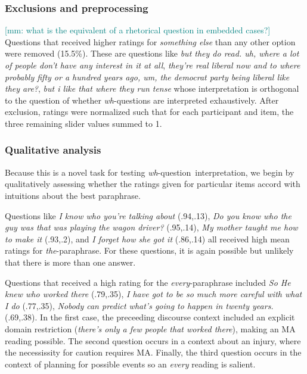 \documentclass[12pt,letterpaper,table,svgnames,dvipsnames]{article}
\newcommand{\mm}[1]{\textcolor{teal}{[mm: #1]}}
\newcommand{\whq}{\emph{wh}-question~}
\begin{document}
\subsubsection{Exclusions and preprocessing}
\mm{what is the equivalent of a rhetorical question in embedded cases?}
Questions that received higher ratings for \emph{something else} than any other option were removed (15.5\%). These are questions like \emph{but they do read. uh, where a lot of people don't have any interest in it at all}, \emph{they're real liberal now and to where probably fifty or a hundred years ago, um, the democrat party being liberal like they are?}, \emph{but i like that where they run tense} whose interpretation is orthogonal to the question of whether \emph{wh}-questions are interpreted exhaustively. After exclusion, ratings were normalized such that for each participant and item, the three remaining slider values summed to 1.  

\subsubsection{Qualitative analysis}
Because this is a novel task for testing \whq interpretation, we begin by qualitatively assessing whether the ratings given for particular items accord with intuitions about the best paraphrase.

Questions like 
\emph{I know who you’re talking about} (.94,.13), 
\emph{Do you know who the guy was that was playing the wagon driver?} (.95,.14), 
\emph{My mother taught me how to make it} (.93,.2), and
\emph{I forget how she got it} (.86,.14) 
all received high mean ratings for \emph{the}-paraphrase. For these questions, it is again possible but unlikely that there is more than one answer.

Questions that received a high rating for the \emph{every}-paraphrase included 
\emph{So He knew who worked there} (.79,.35), 
\emph{I have got to be so much more careful with what I do} (.77,.35), 
\emph{Nobody can predict what's going to happen in twenty years.} (.69,.38).
In the first case, the preceeding discourse context included an explicit domain restriction (\emph{there's only a few people that worked there}), making an MA reading possible. The second question occurs in a context about an injury, where the necessissity for caution requires MA. Finally, the third question occurs in the context of planning for possible events so an \emph{every} reading is salient.
\end{document}
